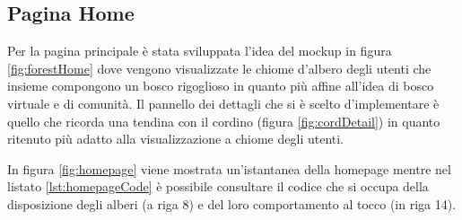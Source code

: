 \subsection{Pagina Home} 
Per la pagina principale è stata sviluppata l'idea del mockup in figura \ref{fig:forestHome} dove vengono visualizzate le chiome d'albero degli utenti che insieme compongono un bosco rigoglioso in quanto più affine all'idea di bosco virtuale e di comunità. 
Il pannello dei dettagli che si è scelto d'implementare è quello che ricorda una tendina con il cordino (figura \ref{fig:cordDetail}) in quanto ritenuto più adatto alla visualizzazione a chiome degli utenti.

In figura \ref{fig:homepage} viene mostrata un'istantanea della homepage mentre nel listato \ref{lst:homepageCode} è possibile consultare il codice che si occupa della disposizione degli alberi (a riga 8) e del loro comportamento al tocco (in riga 14).

